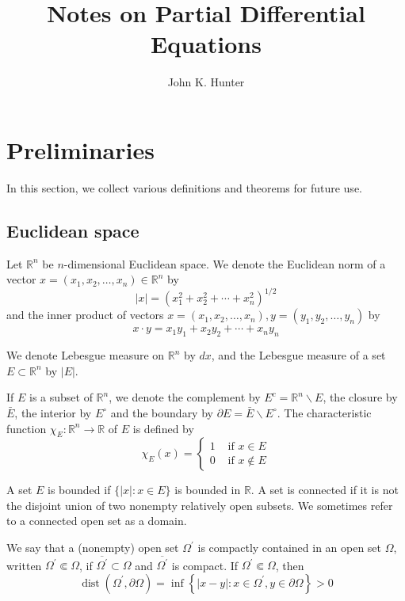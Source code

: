 \documentclass[10pt]{article}
\title{Notes on Partial Differential Equations}
\author{John K. Hunter}
\date{}
\theoremstyle{plain}
\theoremstyle{definition}
\theoremstyle{remark}
\begin{document}
\maketitle

\section{Preliminaries}
In this section, we collect various definitions and theorems for future use.

\subsection{Euclidean space}
Let $\mathbb{R}^{n}$ be $n$-dimensional Euclidean space. We denote the Euclidean norm of a vector $x=\left(x_{1}, x_{2}, \ldots, x_{n}\right) \in \mathbb{R}^{n}$ by
$$
|x|=\left(x_{1}^{2}+x_{2}^{2}+\cdots+x_{n}^{2}\right)^{1 / 2}
$$
and the inner product of vectors $x=\left(x_{1}, x_{2}, \ldots, x_{n}\right), y=\left(y_{1}, y_{2}, \ldots, y_{n}\right)$ by
$$
x \cdot y=x_{1} y_{1}+x_{2} y_{2}+\cdots+x_{n} y_{n}
$$

We denote Lebesgue measure on $\mathbb{R}^{n}$ by $d x$, and the Lebesgue measure of a set $E \subset \mathbb{R}^{n}$ by $|E|$.

If $E$ is a subset of $\mathbb{R}^{n}$, we denote the complement by $E^{c}=\mathbb{R}^{n} \backslash E$, the closure by $\bar{E}$, the interior by $E^{\circ}$ and the boundary by $\partial E=\bar{E} \backslash E^{\circ}$. The characteristic function $\chi_{E}: \mathbb{R}^{n} \rightarrow \mathbb{R}$ of $E$ is defined by
$$
\chi_{E}(x)= \begin{cases}1 & \text { if } x \in E \\ 0 & \text { if } x \notin E\end{cases}
$$

A set $E$ is bounded if $\{|x|: x \in E\}$ is bounded in $\mathbb{R}$. A set is connected if it is not the disjoint union of two nonempty relatively open subsets. We sometimes refer to a connected open set as a domain.

We say that a (nonempty) open set $\Omega^{\prime}$ is compactly contained in an open set $\Omega$, written $\Omega^{\prime} \Subset \Omega$, if $\overline{\Omega^{\prime}} \subset \Omega$ and $\overline{\Omega^{\prime}}$ is compact. If $\Omega^{\prime} \Subset \Omega$, then
$$
\operatorname{dist}\left(\Omega^{\prime}, \partial \Omega\right)=\inf \left\{|x-y|: x \in \Omega^{\prime}, y \in \partial \Omega\right\}>0
$$
\end{document}
